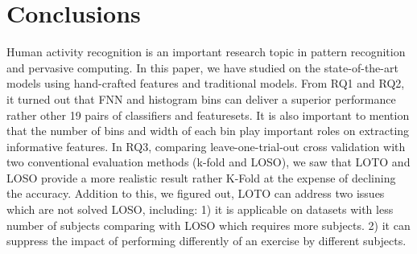 \documentclass[journal,article,submit,moreauthors,pdftex]{Definitions/mdpi}
\begin{document}
\section{Conclusions}

Human activity recognition is an important research topic
in pattern recognition and pervasive computing. In this paper, we have studied on the state-of-the-art models using hand-crafted features and traditional models. From RQ1 and RQ2, it turned out that FNN and histogram bins can deliver a superior performance rather other 19 pairs of classifiers and featuresets. It is also important to mention that the number of bins and width of each bin play important roles on extracting informative features. In RQ3, comparing leave-one-trial-out cross validation with two conventional evaluation methods (k-fold and LOSO), we saw that LOTO and LOSO provide a more realistic result rather K-Fold at the expense of declining the accuracy. Addition to this, we figured out, LOTO can address two issues which are not solved LOSO, including: 1) it is applicable on datasets with less number of subjects comparing with LOSO which requires more subjects. 2) it can suppress the impact of performing differently of an exercise by different subjects. 

\vspace{6pt} 



\end{document}
